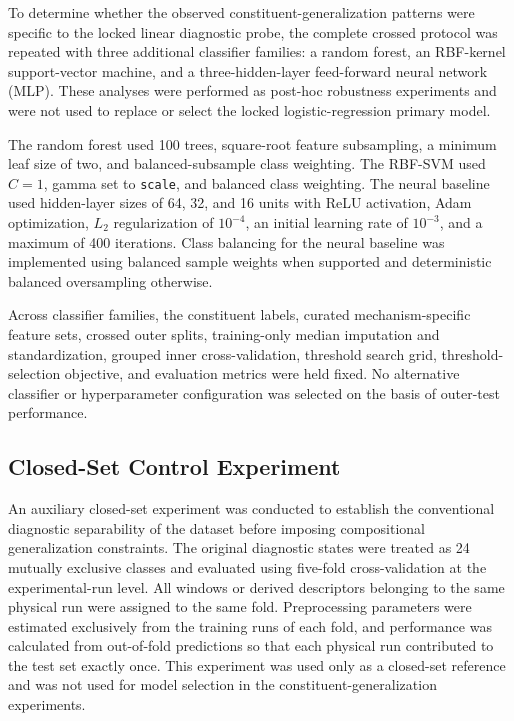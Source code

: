 To determine whether the observed constituent-generalization patterns were
specific to the locked linear diagnostic probe, the complete crossed
protocol was repeated with three additional classifier families: a random
forest, an RBF-kernel support-vector machine, and a three-hidden-layer
feed-forward neural network (MLP). These analyses were performed as
post-hoc robustness experiments and were not used to replace or select the
locked logistic-regression primary model.

The random forest used 100 trees, square-root feature subsampling, a
minimum leaf size of two, and balanced-subsample class weighting. The
RBF-SVM used $C = 1$, gamma set to \texttt{scale}, and balanced class
weighting. The neural baseline used hidden-layer sizes of 64, 32, and 16
units with ReLU activation, Adam optimization, $L_2$ regularization of
$10^{-4}$, an initial learning rate of $10^{-3}$, and a maximum of 400
iterations. Class balancing for the neural baseline was implemented using
balanced sample weights when supported and deterministic balanced
oversampling otherwise.

Across classifier families, the constituent labels, curated
mechanism-specific feature sets, crossed outer splits, training-only median
imputation and standardization, grouped inner cross-validation, threshold
search grid, threshold-selection objective, and evaluation metrics were
held fixed. No alternative classifier or hyperparameter configuration was
selected on the basis of outer-test performance.

\subsection{Closed-Set Control Experiment}
\label{sec:closedset}

An auxiliary closed-set experiment was conducted to establish the
conventional diagnostic separability of the dataset before imposing
compositional generalization constraints. The original diagnostic states
were treated as 24 mutually exclusive classes and evaluated using five-fold
cross-validation at the experimental-run level. All windows or derived
descriptors belonging to the same physical run were assigned to the same
fold. Preprocessing parameters were estimated exclusively from the training
runs of each fold, and performance was calculated from out-of-fold
predictions so that each physical run contributed to the test set exactly
once. This experiment was used only as a closed-set reference and was not
used for model selection in the constituent-generalization experiments.

